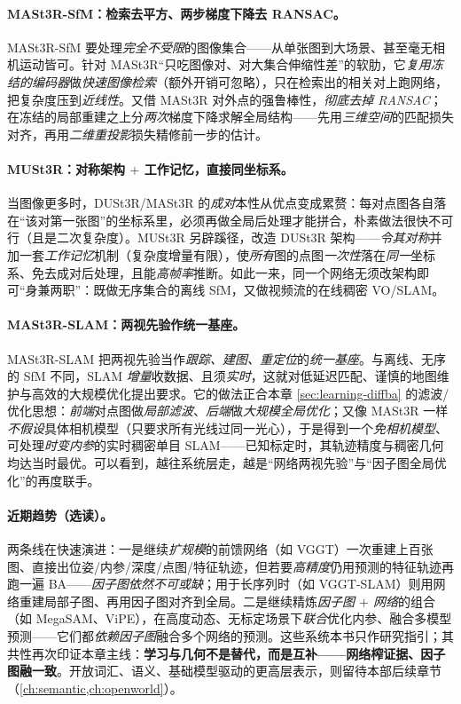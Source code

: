\paragraph{MASt3R-SfM：检索去平方、两步梯度下降去 RANSAC。}
MASt3R-SfM 要处理\emph{完全不受限}的图像集合——从单张图到大场景、甚至毫无相机运动皆可。针对 MASt3R“只吃图像对、对大集合伸缩性差”的软肋，它\emph{复用冻结的编码器}做\emph{快速图像检索}（额外开销可忽略），只在检索出的相关对上跑网络，把复杂度压到\emph{近线性}。又借 MASt3R 对外点的强鲁棒性，\emph{彻底去掉 RANSAC}；在冻结的局部重建之上分\emph{两次}梯度下降求解全局结构——先用\emph{三维空间}的匹配损失对齐，再用\emph{二维重投影}损失精修前一步的估计。

\paragraph{MUSt3R：对称架构 \texorpdfstring{$+$}{+} 工作记忆，直接同坐标系。}
当图像更多时，DUSt3R/MASt3R 的\emph{成对}本性从优点变成累赘：每对点图各自落在“该对第一张图”的坐标系里，必须再做全局后处理才能拼合，朴素做法很快不可行（且是二次复杂度）。MUSt3R 另辟蹊径，改造 DUSt3R 架构——\emph{令其对称}并加一套\emph{工作记忆}机制（复杂度增量有限），使\emph{所有}图的点图\emph{一次性}落在\emph{同一}坐标系、免去成对后处理，且能\emph{高帧率}推断。如此一来，同一个网络无须改架构即可“身兼两职”：既做无序集合的离线 SfM，又做视频流的在线稠密 VO/SLAM。

\paragraph{MASt3R-SLAM：两视先验作统一基座。}
MASt3R-SLAM 把两视先验当作\emph{跟踪、建图、重定位}的\emph{统一基座}。与离线、无序的 SfM 不同，SLAM \emph{增量}收数据、且须\emph{实时}，这就对低延迟匹配、谨慎的地图维护与高效的大规模优化提出要求。它的做法正合本章 \cref{sec:learning-diffba} 的滤波/优化思想：\emph{前端}对点图做\emph{局部滤波}、\emph{后端}做\emph{大规模全局优化}；又像 MASt3R 一样\emph{不假设}具体相机模型（只要求所有光线过同一光心），于是得到一个\emph{免相机模型}、可处理\emph{时变内参}的实时稠密单目 SLAM——已知标定时，其轨迹精度与稠密几何均达当时最优。可以看到，越往系统层走，越是“网络两视先验”与“因子图全局优化”的再度联手。

\paragraph{近期趋势（选读）。}
两条线在快速演进\cite{teed2026boosting}：一是继续\emph{扩规模}的前馈网络（如 VGGT）一次重建上百张图、直接出位姿/内参/深度/点图/特征轨迹，但若要\emph{高精度}仍用预测的特征轨迹再跑一遍 BA——\emph{因子图依然不可或缺}；用于长序列时（如 VGGT-SLAM）则用网络重建局部子图、再用因子图对齐到全局。二是继续精炼\emph{因子图 $+$ 网络}的组合（如 MegaSAM、ViPE），在高度动态、无标定场景下\emph{联合}优化内参、融合多模型预测——它们都\emph{依赖因子图}融合多个网络的预测。这些系统本书只作研究指引；其共性再次印证本章主线：\textbf{学习与几何不是替代，而是互补——网络榨证据、因子图融一致}。开放词汇、语义、基础模型驱动的更高层表示，则留待本部后续章节（\cref{ch:semantic,ch:openworld}）。

